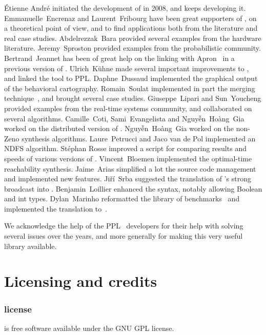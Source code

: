 \sloppy
\'Etienne André initiated the development of \imitator{} in 2008, and keeps developing it.
Emmanuelle~Encrenaz and Laurent~Fribourg have been great supporters of \imitator{}, on a theoretical point of view, and to find applications both from the literature and real case studies.
Abdelrezzak~Bara provided several examples from the hardware literature.
Jeremy~Sproston provided examples from the probabilistic community.
Bertrand~Jeannet has been of great help on the linking with Apron~\cite{JM09} in a previous version of \imitator{}.
Ulrich~K\"uhne made several important improvements to \imitator{}, and linked the tool to PPL.
Daphne~Dussaud implemented the graphical output of the behavioral cartography.
Romain~Soulat implemented in part the merging technique~\cite{AFS13atva}, and brought several case studies.
Giuseppe~Lipari and Sun~Youcheng provided examples from the real-time systems community, and collaborated on several algorithms.
Camille~Coti, Sami~Evangelista and Nguy\~{ê}n~Hoàng~Gia worked on the distributed version of \imitator{}.
Nguy\~{ê}n~Hoàng~Gia worked on the non-Zeno synthesis algorithms.
Laure~Petrucci and Jaco van de Pol implemented an NDFS algorithm.
%
Stéphan Rosse improved a script for comparing results and speeds of various versions of \imitator{}.
%
Vincent~Bloemen implemented the optimal-time reachability synthesis.
%
Jaime~Arias simplified a lot the source code management and implemented new features.
%
Jiří~Srba suggested the translation of \imitator{}'s strong broadcast into \uppaal{}.
%
Benjamin~Loillier enhanced the syntax, notably allowing Boolean and int types.
%
Dylan~Marinho reformatted the library of benchmarks~\cite{AMP21} and implemented the translation to~\jani{}.

We acknowledge the help of the PPL~\cite{BHZ08} developers for their help with solving several issues over the years, and more generally for making this very useful library available.




\chapter{Licensing and credits}

\subsection*{\imitator{} license}
\imitator{} is free software available under the GNU GPL license.

